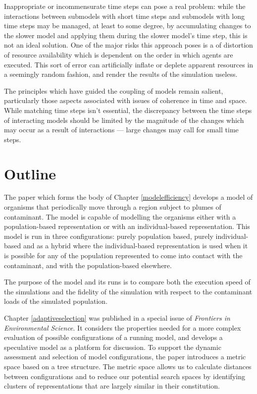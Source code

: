 Inappropriate or incommensurate time steps can pose a real problem:
while the interactions between submodels with short time steps and
submodels with long time steps may be managed, at least to some degree,
by accumulating changes to the slower model and applying them during
the slower model's time step,  this is not an ideal solution. One of
the major risks this approach poses is a of distortion of resource
availability which is dependent on the order in which agents are
executed. This sort of error can artificially inflate or deplete
apparent resources in a seemingly random fashion, and render the
results of the simulation useless.


The principles which have guided the coupling of models remain
salient, particularly those aspects associated with issues of
coherence in time and space. While matching time steps isn't essential,
the discrepancy between the time steps of interacting models should be
limited by the magnitude of the changes which may occur as a result of
interactions --- large changes may call for small time steps.

\section{Outline}
The paper which forms the body of Chapter \ref{modelefficiency}
develops a model of organisms that periodically move through a region
subject to plumes of contaminant.  The model is capable of
modelling the organisms either with a population-based representation
or with an individual-based representation.  This model is run in
three configurations: purely population based, purely individual-based
and as a hybrid where the individual-based representation is used when
it is possible for any of the population represented to come into
contact with the contaminant, and with the  population-based
elsewhere.

The purpose of the model and its runs is to compare both the execution
speed of the simulations and the fidelity of the simulation with
respect to the contaminant loads of the simulated population.

Chapter \ref{adaptiveselection} was published in a special issue
of \emph{Frontiers in Environmental Science}. It considers the 
properties needed for a more complex evaluation of possible
configurations of a running model, and develops a speculative model as
a platform for discussion.  To support the dynamic assessment and
selection of model configurations, the paper introduces a metric space
based on a tree structure. The metric space allows us to calculate
distances between configurations and to reduce our potential search
spaces by identifying clusters of representations that are largely
similar in their constitution.

